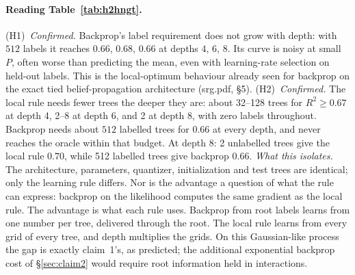 \documentclass[11pt]{article}
\theoremstyle{definition}
\begin{document}
\paragraph{Reading Table~\ref{tab:h2hngt}.}
(H1)~\emph{Confirmed.} Backprop's label requirement does not grow with depth: with $512$ labels it
reaches $0.66$, $0.68$, $0.66$ at depths $4$, $6$, $8$. Its curve is noisy at small $P$, often worse than
predicting the mean, even with learning-rate selection on held-out labels. This is the local-optimum
behaviour already seen for backprop on the exact tied belief-propagation architecture (srg.pdf,
\S5).
(H2)~\emph{Confirmed.} The local rule needs fewer trees the deeper they are: about 32--128 trees for
$R^2\ge0.67$ at depth 4, 2--8 at depth 6, and 2 at depth 8, with zero labels throughout. Backprop needs
about $512$ labelled trees for $0.66$ at every depth, and never reaches the oracle within that budget.
At depth 8: 2 unlabelled trees give the local rule $0.70$, while 512 labelled trees give backprop $0.66$.
\emph{What this isolates.} The architecture, parameters, quantizer, initialization and test trees are
identical; only the learning rule differs. Nor is the advantage a question of what the rule can
express: backprop on the likelihood computes the same gradient as the local rule. The advantage is
what each rule uses. Backprop from root labels learns from one number per tree, delivered through the
root. The local rule learns from every grid of every tree, and depth multiplies the grids. On this
Gaussian-like process the gap is exactly claim~1's, as predicted; the additional exponential
backprop cost of \S\ref{sec:claim2} would require root information held in interactions.
\end{document}
